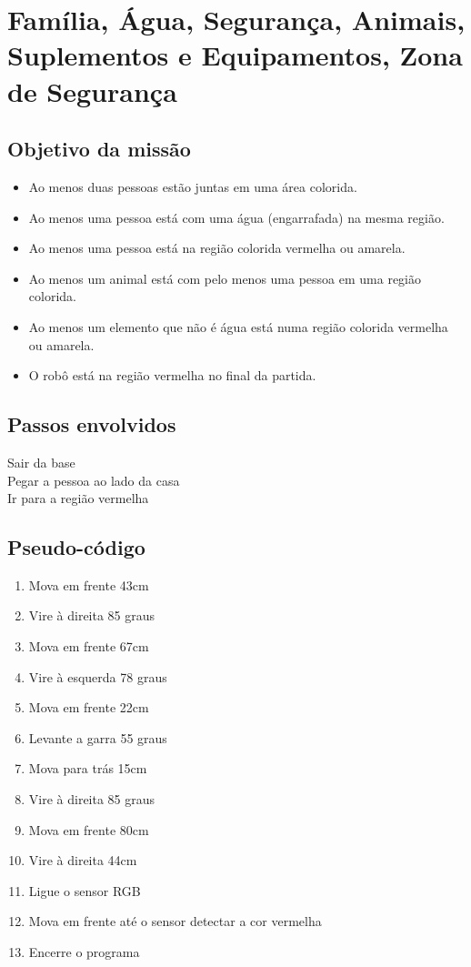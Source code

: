 \documentclass{article}
\begin{document}
\newpage
\section{Família, Água, Segurança, Animais, Suplementos e Equipamentos, Zona de 
Segurança}
	\subsection{Objetivo da missão}
		\begin{itemize}
			\item Ao menos duas pessoas estão juntas em uma área colorida.
			\item Ao menos uma pessoa está com uma água (engarrafada) na mesma 
			região.
			\item Ao menos uma pessoa está na região colorida vermelha ou 
			amarela.
			\item Ao menos um animal está com pelo menos uma pessoa em uma 
			região colorida.
			\item Ao menos um elemento que não é água está numa região colorida 
			vermelha ou amarela.
			\item O robô está na região vermelha no final da partida.
		\end{itemize}

	\subsection{Passos envolvidos}
		Sair da base\\
		Pegar a pessoa ao lado da casa\\
		Ir para a região vermelha\\

	\subsection{Pseudo-código}
		\begin{enumerate}
			\item Mova em frente 43cm
			\item Vire à direita 85 graus
			\item Mova em frente 67cm
			\item Vire à esquerda 78 graus
			\item Mova em frente 22cm
			\item Levante a garra 55 graus
			\item Mova para trás 15cm
			\item Vire à direita 85 graus
			\item Mova em frente 80cm
			\item Vire à direita 44cm
			\item Ligue o sensor RGB
			\item Mova em frente até o sensor detectar a cor vermelha
			\item Encerre o programa
		\end{enumerate}
\end{document}

